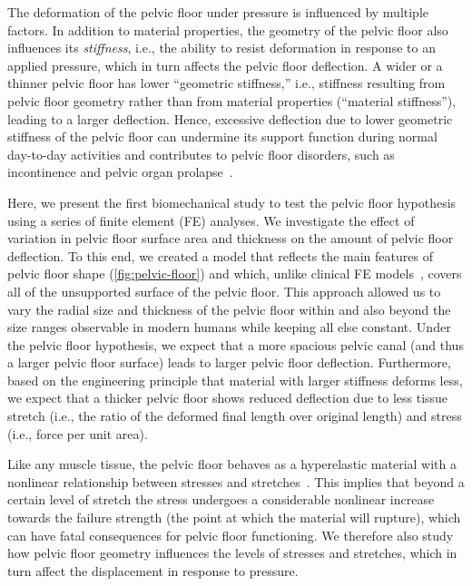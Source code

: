 \documentclass[9pt,twocolumn,twoside]{pnas-new}
\begin{document}
The deformation of the pelvic floor under pressure is influenced by multiple factors. In addition to material properties, the geometry of the pelvic floor also influences its \textit{stiffness}, i.e., the ability to resist deformation in response to an applied pressure, which in turn affects the pelvic floor deflection. A wider or a thinner pelvic floor has lower ``geometric stiffness,” i.e., stiffness resulting from pelvic floor geometry rather than from material properties (``material stiffness”), leading to a larger deflection. Hence, excessive deflection due to lower geometric stiffness of the pelvic floor can undermine its support function during normal day-to-day activities and contributes to pelvic floor disorders, such as incontinence and pelvic organ prolapse~\cite{Bitti2014-tv, Fernandez2015-rb, Schawkat2018-et,El_Sayed2017-sy}.

Here, we present the first biomechanical study to test the pelvic floor hypothesis using a series of finite element (FE) analyses. We investigate the effect of variation in pelvic floor surface area and thickness on the amount of pelvic floor deflection. To this end, we created a model that reflects the main features of pelvic floor shape (\cref{fig:pelvic-floor}) and which, unlike clinical FE models~\cite{Martins2007-jn, Noakes2008-ee, Parente2008-ts,Cosson2013-ss,Jing2012-uu,Mayeur2016-qi, Silva2017-uz,Gordon2019-zl}, covers all of the unsupported surface of the pelvic floor. This approach allowed us to vary the radial size and thickness of the pelvic floor within and also beyond the size ranges observable in modern humans while keeping all else constant. Under the pelvic floor hypothesis, we expect that a more spacious pelvic canal (and thus a larger pelvic floor surface) leads to larger pelvic floor deflection. Furthermore, based on the engineering principle that material with larger stiffness deforms less, we expect that a thicker pelvic floor shows reduced deflection due to less tissue stretch (i.e., the ratio of the deformed final length over original length) and stress (i.e., force per unit area).

Like any muscle tissue, the pelvic floor behaves as a hyperelastic material with a nonlinear relationship between stresses and stretches~\cite{Humphrey2003-rb}. This implies that beyond a certain level of stretch the stress undergoes a considerable nonlinear increase towards the failure strength (the point at which the material will rupture), which can have fatal consequences for pelvic floor functioning. We therefore also study how pelvic floor geometry influences the levels of stresses and stretches, which in turn affect the displacement in response to pressure.  
\end{document}
